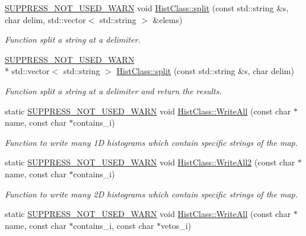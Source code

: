 \begin{DoxyCompactItemize}
\hyperlink{HistClass_8hh_a85edd6ac47f5ea2970c76af20855738c}{S\-U\-P\-P\-R\-E\-S\-S\-\_\-\-N\-O\-T\-\_\-\-U\-S\-E\-D\-\_\-\-W\-A\-R\-N} void \hyperlink{namespaceHistClass_a1e46657e3e96e1344690fb3e9a8fb45e}{Hist\-Class\-::split} (const std\-::string \&s, char delim, std\-::vector$<$ std\-::string $>$ \&elems)
\begin{DoxyCompactList}\small\item\em Function split a string at a delimiter. \end{DoxyCompactList}\item 
\hyperlink{HistClass_8hh_a85edd6ac47f5ea2970c76af20855738c}{S\-U\-P\-P\-R\-E\-S\-S\-\_\-\-N\-O\-T\-\_\-\-U\-S\-E\-D\-\_\-\-W\-A\-R\-N} \\*
std\-::vector$<$ std\-::string $>$ \hyperlink{namespaceHistClass_a6ebdd346a3c6631aee671db3f377b668}{Hist\-Class\-::split} (const std\-::string \&s, char delim)
\begin{DoxyCompactList}\small\item\em Function split a string at a delimiter and return the results. \end{DoxyCompactList}\item 
static \hyperlink{HistClass_8hh_a85edd6ac47f5ea2970c76af20855738c}{S\-U\-P\-P\-R\-E\-S\-S\-\_\-\-N\-O\-T\-\_\-\-U\-S\-E\-D\-\_\-\-W\-A\-R\-N} void \hyperlink{namespaceHistClass_a23e09b3d56b8aa284e228a8a85fb37ec}{Hist\-Class\-::\-Write\-All} (const char $\ast$name, const char $\ast$contains\-\_\-i)
\begin{DoxyCompactList}\small\item\em Function to write many 1\-D histograms which contain specific strings of the map. \end{DoxyCompactList}\item 
static \hyperlink{HistClass_8hh_a85edd6ac47f5ea2970c76af20855738c}{S\-U\-P\-P\-R\-E\-S\-S\-\_\-\-N\-O\-T\-\_\-\-U\-S\-E\-D\-\_\-\-W\-A\-R\-N} void \hyperlink{namespaceHistClass_a4b81fc3ad235d6627f447a7dfb871947}{Hist\-Class\-::\-Write\-All2} (const char $\ast$name, const char $\ast$contains\-\_\-i)
\begin{DoxyCompactList}\small\item\em Function to write many 2\-D histograms which contain specific strings of the map. \end{DoxyCompactList}\item 
static \hyperlink{HistClass_8hh_a85edd6ac47f5ea2970c76af20855738c}{S\-U\-P\-P\-R\-E\-S\-S\-\_\-\-N\-O\-T\-\_\-\-U\-S\-E\-D\-\_\-\-W\-A\-R\-N} void \hyperlink{namespaceHistClass_a01b819e4439174c88bdaa557804f7eb2}{Hist\-Class\-::\-Write\-All} (const char $\ast$name, const char $\ast$contains\-\_\-i, const char $\ast$vetos\-\_\-i)

\end{DoxyCompactItemize}
